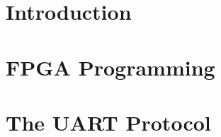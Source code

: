 \documentclass[fleqn,10pt]{SelfArx} %
\affiliation{*\textbf{Autor}: luis@qube.email} %
\begin{document}
\maketitle %

\tableofcontents %

\thispagestyle{empty} %


\section*{Introduction} %




\section{ FPGA Programming }


\section{The UART Protocol}

















\end{document}
